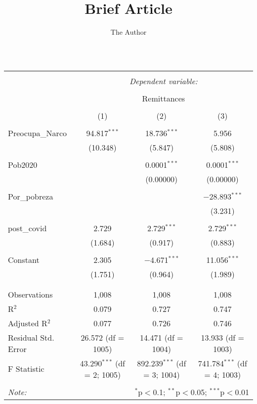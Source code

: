 \documentclass[11pt, oneside]{article}   	%
\title{Brief Article}
\author{The Author}
\begin{document}
\maketitle
\begin{table}[!htbp] \centering 
  \caption{} 
  \label{} 
\begin{tabular}{@{\extracolsep{5pt}}lccc} 
\\[-1.8ex]\hline 
\hline \\[-1.8ex] 
 & \multicolumn{3}{c}{\textit{Dependent variable:}} \\ 
\cline{2-4} 
\\[-1.8ex] & \multicolumn{3}{c}{Remittances} \\ 
\\[-1.8ex] & (1) & (2) & (3)\\ 
\hline \\[-1.8ex] 
 Preocupa\_Narco & 94.817$^{***}$ & 18.736$^{***}$ & 5.956 \\ 
  & (10.348) & (5.847) & (5.808) \\ 
  & & & \\ 
 Pob2020 &  & 0.0001$^{***}$ & 0.0001$^{***}$ \\ 
  &  & (0.00000) & (0.00000) \\ 
  & & & \\ 
 Por\_pobreza &  &  & $-$28.893$^{***}$ \\ 
  &  &  & (3.231) \\ 
  & & & \\ 
 post\_covid & 2.729 & 2.729$^{***}$ & 2.729$^{***}$ \\ 
  & (1.684) & (0.917) & (0.883) \\ 
  & & & \\ 
 Constant & 2.305 & $-$4.671$^{***}$ & 11.056$^{***}$ \\ 
  & (1.751) & (0.964) & (1.989) \\ 
  & & & \\ 
\hline \\[-1.8ex] 
Observations & 1,008 & 1,008 & 1,008 \\ 
R$^{2}$ & 0.079 & 0.727 & 0.747 \\ 
Adjusted R$^{2}$ & 0.077 & 0.726 & 0.746 \\ 
Residual Std. Error & 26.572 (df = 1005) & 14.471 (df = 1004) & 13.933 (df = 1003) \\ 
F Statistic & 43.290$^{***}$ (df = 2; 1005) & 892.239$^{***}$ (df = 3; 1004) & 741.784$^{***}$ (df = 4; 1003) \\ 
\hline 
\hline \\[-1.8ex] 
\textit{Note:}  & \multicolumn{3}{r}{$^{*}$p$<$0.1; $^{**}$p$<$0.05; $^{***}$p$<$0.01} \\ 
\end{tabular} 
\end{table} 
\end{document}
